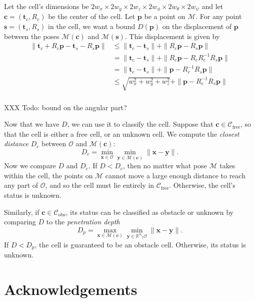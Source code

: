 \documentclass[review]{acmsiggraph}
\newcommand{\cm}{\mathcal{M}}
\newcommand{\by}{\mathbf{y}}
\newcommand{\bx}{\mathbf{x}}
\newcommand{\bt}{\mathbf{t}}
\newcommand{\bc}{\mathbf{c}}
\newcommand{\bs}{\mathbf{s}}
\newcommand{\bp}{\mathbf{p}}
\newcommand{\Cfree}{\mathcal{C}_{\mathrm{free}}}
\newcommand{\Cobs}{\mathcal{C}_{\mathrm{obs}}}
\newcommand{\co}{\mathcal{O}}
\begin{document}
Let the cell's dimensions be $2w_x \times 2w_y \times 2w_z \times 2w_{\phi} \times 2w_{\theta} \times 2w_{\psi}$ and let $\bc = (\bt_c, R_c)$ be the center of the cell. Let $\bp$  be a point on $\cm$. For any point $\bs = (\bt_s, R_s)$ in the cell, we want a bound $D(\bp)$ on the displacement of $\bp$ between the poses $\cm(\bc)$ and $\cm(\bs)$. This displacement is given by
\begin{align*}
\|\bt_c + R_c\bp - \bt_s - R_s\bp\| &\leq \|\bt_c -\bt_s\| + \|R_c\bp - R_s\bp\|\\
&= \|\bt_c - \bt_s\| + \|R_c \bp - R_c R_c^{-1}R_s \bp\|\\
&= \|\bt_c - \bt_s\| + \| \bp - R_c^{-1}R_s \bp\|\\
&\leq \sqrt{w_x^2 + w_y^2+w_z^2} + \| \bp - R_c^{-1}R_s \bp\|\\
\end{align*}

XXX Todo: bound on the angular part?

Now that we have $D$, we can use it to classify the cell. Suppose that $\bc \in \Cfree$, so that the cell is either a free cell, or an unknown cell. We compute the \emph{closest distance} $D_c$ between $\co$ and $\cm(\bc)$:
$$D_c = \min_{\bx \in \co} \min_{\by \in \cm(\bc)} \|\bx-\by\|.$$
Now we compare $D$ and $D_c$. If $D < D_c$, then no matter what pose $\cm$ takes within the cell, the points on $\cm$ cannot move a large enough distance to reach any part of $\co$, and so the cell must lie entirely in $\Cfree$. Otherwise, the cell's status is unknown.

Similarly, if $\bc \in \Cobs$, its status can be classified as obstacle or unknown by comparing $D$ to the \emph{penetration depth}
$$D_p = \max_{\bx \in \cm(\bc)} \min_{\by \in \mathbb{R}^3\setminus \co} \|\bx - \by\|.$$
If $D < D_p$, the cell is guaranteed to be an obstacle cell. Otherwise, its status is unknown.
\section*{Acknowledgements}



\end{document}
